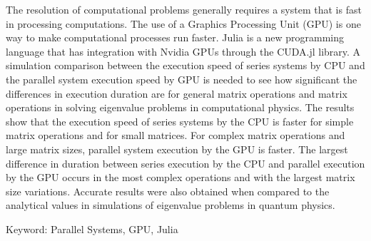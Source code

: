 \documentclass{skripsiactugm}
\begin{document}
\begin{abstracteng}
	The resolution of computational problems generally requires a system that is fast in processing computations. The use of a Graphics Processing Unit (GPU) is one way to make computational processes run faster. Julia is a new programming language that has integration with Nvidia GPUs through the CUDA.jl library. A simulation comparison between the execution speed of series systems by CPU and the parallel system execution speed by GPU is needed to see how significant the differences in execution duration are for general matrix operations and matrix operations in solving eigenvalue problems in computational physics. The results show that the execution speed of series systems by the CPU is faster for simple matrix operations and for small matrices. For complex matrix operations and large matrix sizes, parallel system execution by the GPU is faster. The largest difference in duration between series execution by the CPU and parallel execution by the GPU occurs in the most complex operations and with the largest matrix size variations. Accurate results were also obtained when compared to the analytical values in simulations of eigenvalue problems in quantum physics.

	\vspace{0.4cm}
	\noindent
	Keyword: Parallel Systems, GPU, Julia
\end{abstracteng}










\end{document}
